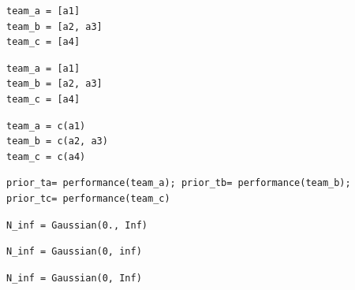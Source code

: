 \documentclass[a4paper,10pt]{book}
\theoremstyle{definition}
\newif\ifen
\newif\ifes
\newcommand{\en}[1]{\ifen#1\fi}
\newcommand{\es}[1]{\ifes#1\fi}
\begin{document}
\en{Before we start, we set the landscape: we compute the prior performance of the teams using the function \texttt{performance()}; we initialize the undefined messages using a neutral form, such as a Gaussian distribution with an infinite variance; and we compute the margins for each comparison $d_j$. }%
\es{Antes de empezar preparamos el escenario: computamos el desempe\~no a priori de los equipos usando la funci\'on \texttt{performance()}; inicializamos los mensajes que a\'un no est\'an definidos con una forma neutra, como una distribuci\'on gaussiana con varianza infinita; y calculamos los m\'argenes de cada comparaci\'on $d_j$. }%
%
\begin{lstlisting}[backgroundcolor=\color{all}, label=lst:graphical_model, caption={\en{Setting the landscape}\es{Preparaci\'on del escenario}}, belowskip=-1.0 \baselineskip, aboveskip=0.1cm]
\end{lstlisting}
\begin{paracol}{3}
\begin{lstlisting}[backgroundcolor=\color{julia!60}, belowskip=-0.77 \baselineskip]
team_a = [a1]
team_b = [a2, a3]
team_c = [a4]
\end{lstlisting}
  \switchcolumn
\begin{lstlisting}[backgroundcolor=\color{python!60}, belowskip=-0.77 \baselineskip]
team_a = [a1]
team_b = [a2, a3]
team_c = [a4]
\end{lstlisting}
   \switchcolumn
\begin{lstlisting}[backgroundcolor=\color{r!50}, belowskip=-0.77 \baselineskip]
team_a = c(a1)
team_b = c(a2, a3)
team_c = c(a4)
\end{lstlisting}  
\end{paracol}
\begin{lstlisting}[backgroundcolor=\color{all},belowskip=-0.77 \baselineskip]
prior_ta= performance(team_a); prior_tb= performance(team_b); prior_tc= performance(team_c)
\end{lstlisting}
\begin{paracol}{3}
\begin{lstlisting}[backgroundcolor=\color{julia!60},belowskip=-0.77 \baselineskip]
N_inf = Gaussian(0., Inf)
\end{lstlisting}
\switchcolumn
\begin{lstlisting}[backgroundcolor=\color{python!60},belowskip=-0.77 \baselineskip]
N_inf = Gaussian(0, inf)
\end{lstlisting}
\switchcolumn
\begin{lstlisting}[backgroundcolor=\color{r!50},belowskip=-0.77 \baselineskip]
N_inf = Gaussian(0, Inf)
\end{lstlisting}
\end{paracol}
\end{document}
